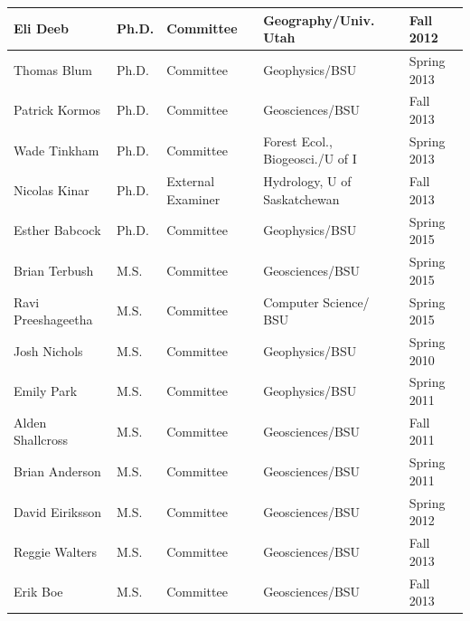 \documentclass[11pt]{article}
\begin{document}
\begin{table}[!htbp]
\begin{tabular}{|l|l|l|l|l|}
Eli Deeb & Ph.D. & Committee & Geography/Univ. Utah & Fall 2012 \\ \hline
Thomas Blum & Ph.D. & Committee & Geophysics/BSU & Spring 2013 \\ \hline
Patrick Kormos & Ph.D. & Committee & Geosciences/BSU & Fall 2013 \\ \hline
Wade Tinkham & Ph.D. & Committee & Forest Ecol., Biogeosci./U of I  & Spring 2013 \\ \hline
Nicolas Kinar & Ph.D. & External Examiner & Hydrology, U of Saskatchewan & Fall 2013 \\ \hline
Esther Babcock & Ph.D. & Committee & Geophysics/BSU & Spring 2015 \\ \hline
Brian Terbush & M.S. & Committee & Geosciences/BSU & Spring 2015 \\ \hline
Ravi Preeshageetha & M.S. & Committee & Computer Science/ BSU & Spring 2015 \\ \hline
Josh Nichols & M.S. & Committee & Geophysics/BSU & Spring 2010 \\ \hline
Emily Park & M.S. & Committee & Geophysics/BSU & Spring 2011 \\ \hline
Alden Shallcross & M.S. & Committee & Geosciences/BSU & Fall 2011 \\ \hline
Brian Anderson & M.S. & Committee & Geosciences/BSU & Spring 2011 \\ \hline
David Eiriksson & M.S. & Committee & Geosciences/BSU & Spring 2012 \\ \hline
Reggie Walters & M.S. & Committee & Geosciences/BSU & Fall 2013 \\ \hline
Erik Boe & M.S. & Committee & Geosciences/BSU & Fall 2013 \\ \hline
\end{tabular}
\end{table}

\pagebreak
\end{document}
